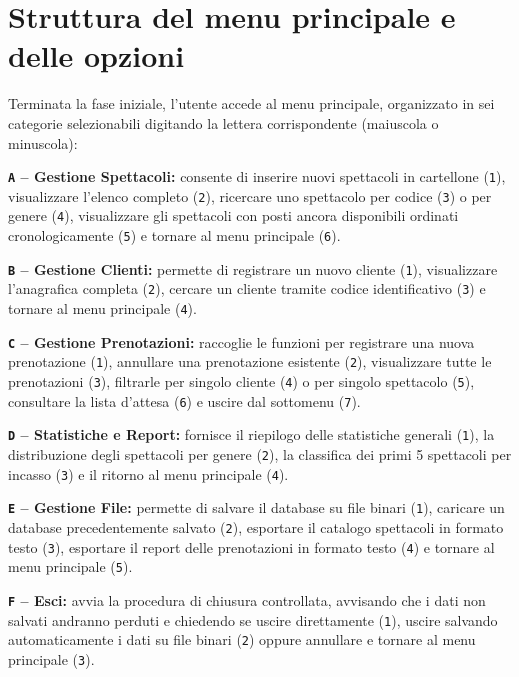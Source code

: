 \documentclass[11pt,a4paper,oneside,openany]{book}
\newenvironment{listacomp}{%
    \small
    \begin{list}{\textendash}{%
        \setlength{\topsep}{2pt}%
        \setlength{\partopsep}{0pt}%
        \setlength{\itemsep}{1pt}%
        \setlength{\parsep}{0pt}%
        \setlength{\leftmargin}{1.2em}%
    }%
}{%
    \end{list}%
}
\begin{document}
\section{Struttura del menu principale e delle opzioni}
Terminata la fase iniziale, l'utente accede al menu principale, organizzato in sei categorie selezionabili digitando la lettera corrispondente (maiuscola o minuscola):
\begin{listacomp}
    \item \textbf{\texttt{A} -- Gestione Spettacoli:} consente di inserire nuovi spettacoli in cartellone (\texttt{1}), visualizzare l'elenco completo (\texttt{2}), ricercare uno spettacolo per codice (\texttt{3}) o per genere (\texttt{4}), visualizzare gli spettacoli con posti ancora disponibili ordinati cronologicamente (\texttt{5}) e tornare al menu principale (\texttt{6}).
    \item \textbf{\texttt{B} -- Gestione Clienti:} permette di registrare un nuovo cliente (\texttt{1}), visualizzare l'anagrafica completa (\texttt{2}), cercare un cliente tramite codice identificativo (\texttt{3}) e tornare al menu principale (\texttt{4}).
    \item \textbf{\texttt{C} -- Gestione Prenotazioni:} raccoglie le funzioni per registrare una nuova prenotazione (\texttt{1}), annullare una prenotazione esistente (\texttt{2}), visualizzare tutte le prenotazioni (\texttt{3}), filtrarle per singolo cliente (\texttt{4}) o per singolo spettacolo (\texttt{5}), consultare la lista d'attesa (\texttt{6}) e uscire dal sottomenu (\texttt{7}).
    \item \textbf{\texttt{D} -- Statistiche e Report:} fornisce il riepilogo delle statistiche generali (\texttt{1}), la distribuzione degli spettacoli per genere (\texttt{2}), la classifica dei primi 5 spettacoli per incasso (\texttt{3}) e il ritorno al menu principale (\texttt{4}).
    \item \textbf{\texttt{E} -- Gestione File:} permette di salvare il database su file binari (\texttt{1}), caricare un database precedentemente salvato (\texttt{2}), esportare il catalogo spettacoli in formato testo (\texttt{3}), esportare il report delle prenotazioni in formato testo (\texttt{4}) e tornare al menu principale (\texttt{5}).
    \item \textbf{\texttt{F} -- Esci:} avvia la procedura di chiusura controllata, avvisando che i dati non salvati andranno perduti e chiedendo se uscire direttamente (\texttt{1}), uscire salvando automaticamente i dati su file binari (\texttt{2}) oppure annullare e tornare al menu principale (\texttt{3}).
\end{listacomp}
\end{document}
